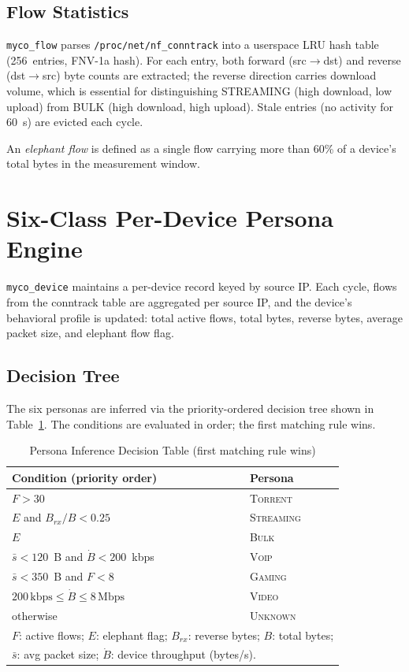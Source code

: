 \subsection{Flow Statistics}

\texttt{myco\_flow} parses \texttt{/proc/net/nf\_conntrack} into a userspace LRU hash table (256~entries, FNV-1a hash). For each entry, both forward (src$\to$dst) and reverse (dst$\to$src) byte counts are extracted; the reverse direction carries download volume, which is essential for distinguishing STREAMING (high download, low upload) from BULK (high download, high upload). Stale entries (no activity for 60~s) are evicted each cycle.

An \emph{elephant flow} is defined as a single flow carrying more than 60\% of a device's total bytes in the measurement window.

\section{Six-Class Per-Device Persona Engine}

\texttt{myco\_device} maintains a per-device record keyed by source IP. Each cycle, flows from the conntrack table are aggregated per source IP, and the device's behavioral profile is updated: total active flows, total bytes, reverse bytes, average packet size, and elephant flow flag.

\subsection{Decision Tree}

The six personas are inferred via the priority-ordered decision tree shown in Table~\ref{tab:persona}. The conditions are evaluated in order; the first matching rule wins.

\begin{table}[h]
\caption{Persona Inference Decision Table (first matching rule wins)}
\label{tab:persona}
\centering
\small
\begin{tabular}{p{5cm}p{3cm}}
\toprule
\textbf{Condition (priority order)} & \textbf{Persona} \\
\midrule
$F > 30$ & \textsc{Torrent} \\
$E$ and $B_{rx}/B < 0.25$ & \textsc{Streaming} \\
$E$ & \textsc{Bulk} \\
$\bar{s} < 120$~B and $\dot{B} < 200$~kbps & \textsc{Voip} \\
$\bar{s} < 350$~B and $F < 8$ & \textsc{Gaming} \\
$200\,\text{kbps} \le \dot{B} \le 8\,\text{Mbps}$ & \textsc{Video} \\
otherwise & \textsc{Unknown} \\
\bottomrule
\multicolumn{2}{l}{\footnotesize $F$: active flows; $E$: elephant flag; $B_{rx}$: reverse bytes; $B$: total bytes;} \\
\multicolumn{2}{l}{\footnotesize $\bar{s}$: avg packet size; $\dot{B}$: device throughput (bytes/s).} \\
\end{tabular}
\end{table}

